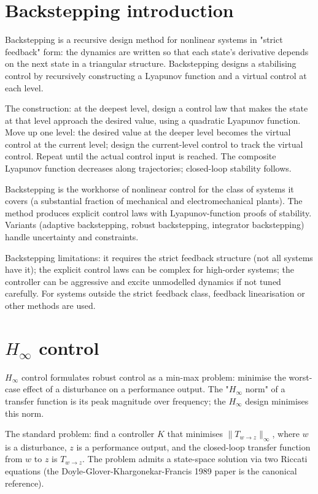 \section{Backstepping introduction}

Backstepping is a recursive design method for nonlinear systems in "strict feedback" form: the dynamics are written so that each state's derivative depends on the next state in a triangular structure. Backstepping designs a stabilising control by recursively constructing a Lyapunov function and a virtual control at each level.

The construction: at the deepest level, design a control law that makes the state at that level approach the desired value, using a quadratic Lyapunov function. Move up one level: the desired value at the deeper level becomes the virtual control at the current level; design the current-level control to track the virtual control. Repeat until the actual control input is reached. The composite Lyapunov function decreases along trajectories; closed-loop stability follows.

Backstepping is the workhorse of nonlinear control for the class of systems it covers (a substantial fraction of mechanical and electromechanical plants). The method produces explicit control laws with Lyapunov-function proofs of stability. Variants (adaptive backstepping, robust backstepping, integrator backstepping) handle uncertainty and constraints.

Backstepping limitations: it requires the strict feedback structure (not all systems have it); the explicit control laws can be complex for high-order systems; the controller can be aggressive and excite unmodelled dynamics if not tuned carefully. For systems outside the strict feedback class, feedback linearisation or other methods are used.

\section{$H_\infty$ control}

$H_\infty$ control formulates robust control as a min-max problem: minimise the worst-case effect of a disturbance on a performance output. The "$H_\infty$ norm" of a transfer function is its peak magnitude over frequency; the $H_\infty$ design minimises this norm.

The standard problem: find a controller $K$ that minimises $\|T_{w \to z}\|_\infty$, where $w$ is a disturbance, $z$ is a performance output, and the closed-loop transfer function from $w$ to $z$ is $T_{w \to z}$. The problem admits a state-space solution via two Riccati equations (the Doyle-Glover-Khargonekar-Francis 1989 paper is the canonical reference).

